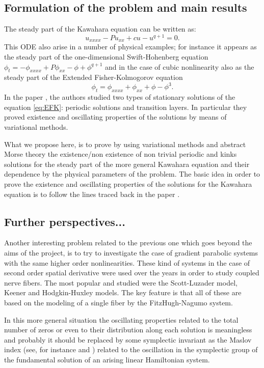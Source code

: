 \documentclass[11pt,oneside,letterpaper,leqno,final]{article}
\begin{document}
\subsection*{Formulation of the problem and main results} The steady
part of the Kawahara equation can be written as:
\[
u_{xxxx}-Pu_{xx} + cu -u^{q+1}=0.
\]
This ODE also arise in a number of physical examples; for instance it appears as
the steady part of the one-dimensional Swift-Hohenberg equation $
\phi_t=-\phi_{xxxx}+P\phi_{xx} -\phi + \phi^{q+1}$
and in the case of cubic nonlinearity also as the steady part
of the Extended Fisher-Kolmogorov equation
\begin{equation}\label{eq:EFK}
\phi_t=\phi_{xxxx}+\phi_{xx} +\phi - \phi^3.
\end{equation}
In the paper \cite{PTV}, the authors studied two types of stationary solutions of the equation \eqref{eq:EFK}:
periodic solutions and transition layers. In particular they proved existence and oscillating properties of the
solutions by means of variational methods.

\noindent
What we propose here, is to prove by using variational methods and abstract
Morse theory the existence/non existence of non trivial periodic and kinks solutions for the steady part of the more general Kawahara equation and their dependence by the physical parameters of the problem. The basic idea in order to prove the existence and oscillating properties of the solutions for the Kawahara equation is to follow the lines traced back in the paper \cite{PTV}.

\subsection*{Further perspectives...}

Another interesting problem related to the previous one which goes beyond the aims of the project, is
to try to investigate the case of gradient parabolic systems with the same
higher order nonlinearities. These kind of systems in the case of second order spatial derivative  were used over the years in order to study coupled nerve fibers. The most popular and studied were the Scott-Luzader model, Keener and Hodgkin-Huxley models. The key feature is that all of these are based on the modeling of a single fiber by the  FitzHugh-Nagumo system.

\noindent
In this more general situation the oscillating properties related to the total number of zeros or even to their distribution along each solution is meaningless and probably it should be replaced by some symplectic invariant as the Maslov index (see, for instance \cite{a1967} and \cite{a1985}) related to the oscillation in the symplectic group of the fundamental solution of an arising linear Hamiltonian system.
\end{document}
